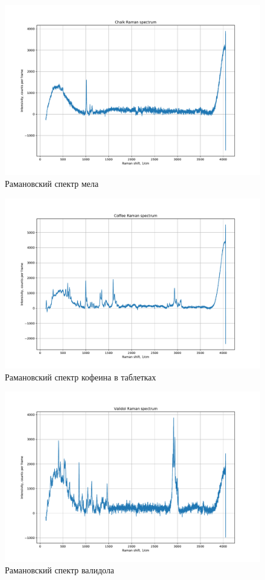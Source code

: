 \documentclass[a4paper, 12pt]{article}
\begin{document}
\begin{figure}[H]
	\centering
	\includegraphics[width=0.9\linewidth]{raman_chalk}
	\caption{Рамановский спектр мела}
	\label{fig:chalk}
\end{figure}

\begin{figure}[H]
	\centering
	\includegraphics[width=0.9\linewidth]{raman_coffee}
	\caption{Рамановский спектр кофеина в таблетках}
	\label{fig:coffee}
\end{figure}

\begin{figure}[H]
	\centering
	\includegraphics[width=0.9\linewidth]{raman_validol}
	\caption{Рамановский спектр валидола}
	\label{fig:validol}
\end{figure}
\end{document}
